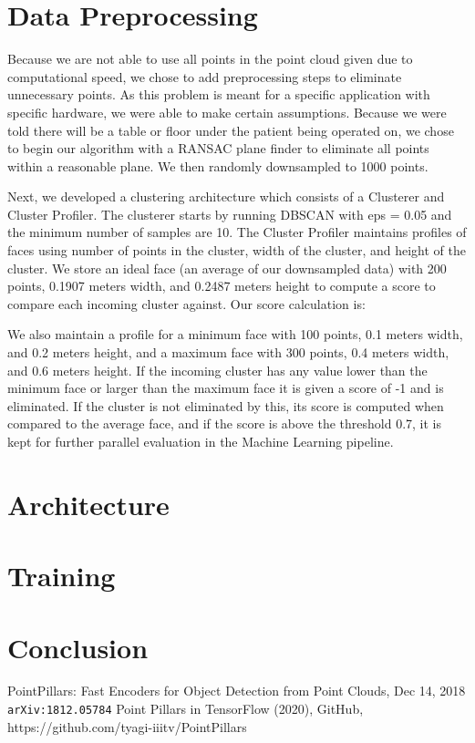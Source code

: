 \documentclass{article}
\begin{document}
\section{Data Preprocessing}
Because we are not able to use all points in the point cloud given due to computational speed, we chose to add preprocessing steps to eliminate unnecessary points. As this problem is meant for a specific application with specific hardware, we were able to make certain assumptions. Because we were told there will be a table or floor under the patient being operated on, we chose to begin our algorithm with a RANSAC plane finder to eliminate all points within a reasonable plane. We then randomly downsampled to 1000 points. 

Next, we developed a clustering architecture which consists of a Clusterer and Cluster Profiler. The clusterer starts by running DBSCAN with eps = 0.05 and the minimum number of samples are 10. The Cluster Profiler maintains profiles of faces using number of points in the cluster, width of the cluster, and height of the cluster. We store an ideal face (an average of our downsampled data) with 200 points, 0.1907 meters width, and 0.2487 meters height to compute a score to compare each incoming cluster against. Our score calculation is:

We also maintain a profile for a minimum face with 100 points, 0.1 meters width, and 0.2 meters height, and a maximum face with 300 points, 0.4 meters width, and 0.6 meters height. If the incoming cluster has any value lower than the minimum face or larger than the maximum face it is given a score of -1 and is eliminated. If the cluster is not eliminated by this, its score is computed when compared to the average face, and if the score is above the threshold 0.7, it is kept for further parallel evaluation in the Machine Learning pipeline.  

\section{Architecture}

\section{Training}

\section{Conclusion}

\begin{thebibliography}{9}
PointPillars: Fast Encoders for Object Detection from Point Clouds, Dec 14, 2018
\\\texttt{arXiv:1812.05784}
Point Pillars in TensorFlow (2020), GitHub, https://github.com/tyagi-iiitv/PointPillars
\end{thebibliography}
\end{document}
